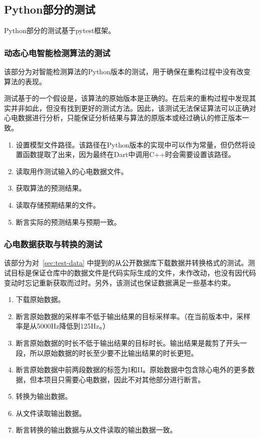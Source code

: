 \subsection{Python部分的测试}\label{subsec:test-python}

Python部分的测试基于pytest框架。

\subsubsection{动态心电智能检测算法的测试}\label{subsubsec:test-pytorch}

该部分为对智能检测算法的Python版本的测试，用于确保在重构过程中没有改变算法的表现。

测试基于的一个假设是，该算法的原始版本是正确的。在后来的重构过程中发现其实并非如此，但没有找到更好的测试方法。因此，该测试无法保证算法可以正确对心电数据进行分析，只能保证分析结果与算法的原版本或经过确认的修正版本一致。

\begin{enumerate}
    \item 设置模型文件路径。该路径在Python版本的实现中可以作为常量，但仍然将设置函数提取了出来，因为最终在Dart中调用C++时会需要设置该路径。
    \item 读取用作测试输入的心电数据文件。
    \item 获取算法的预测结果。
    \item 读取存储预期结果的文件。
    \item 断言实际的预测结果与预期一致。
\end{enumerate}

\subsubsection{心电数据获取与转换的测试}

该部分为对~\ref{sec:test-data} 中提到的从公开数据库下载数据并转换格式的测试。测试目标是保证仓库中的数据文件是代码实际生成的文件，未作改动，也没有因代码变动时忘记重新获取而过时。另外，该测试也保证数据满足一些基本约束。

\begin{enumerate}
    \item 下载原始数据。
    \item 断言原始数据的采样率不低于输出结果的目标采样率。（在当前版本中，采样率是从5000Hz降低到125Hz。）
    \item 断言原始数据的时长不低于输出结果的目标时长。输出结果是裁剪了开头一段，所以原始数据的时长至少要不比输出结果的时长更短。
    \item 断言原始数据中前两段数据的标签为I和II。原始数据中包含除心电外的更多数据，但本项目只需要心电数据，因此不对其他部分进行断言。
    \item 转换为输出数据。
    \item 从文件读取输出数据。
    \item 断言转换的输出数据与从文件读取的输出数据一致。
\end{enumerate}


